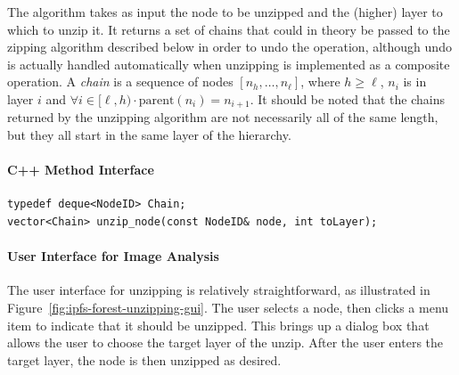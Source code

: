 The algorithm takes as input the node to be unzipped and the (higher) layer to which to unzip it. It returns a set of chains that could in theory be passed to the zipping algorithm described below in order to undo the operation, although undo is actually handled automatically when unzipping is implemented as a composite operation. A \emph{chain} is a sequence of nodes $[n_h,\ldots,n_\ell]$, where $h \ge \ell$, $n_i$ is in layer $i$ and $\forall i \in [\ell,h) \cdot \mbox{parent}(n_i) = n_{i+1}$. It should be noted that the chains returned by the unzipping algorithm are not necessarily all of the same length, but they all start in the same layer of the hierarchy.

\paragraph{C++ Method Interface}

\begin{lstlisting}[style=Prototype]
typedef deque<NodeID> Chain;
vector<Chain> unzip_node(const NodeID& node, int toLayer);
\end{lstlisting}

\paragraph{User Interface for Image Analysis}

The user interface for unzipping is relatively straightforward, as illustrated in Figure~\ref{fig:ipfs-forest-unzipping-gui}. The user selects a node, then clicks a menu item to indicate that it should be unzipped. This brings up a dialog box that allows the user to choose the target layer of the unzip. After the user enters the target layer, the node is then unzipped as desired.

